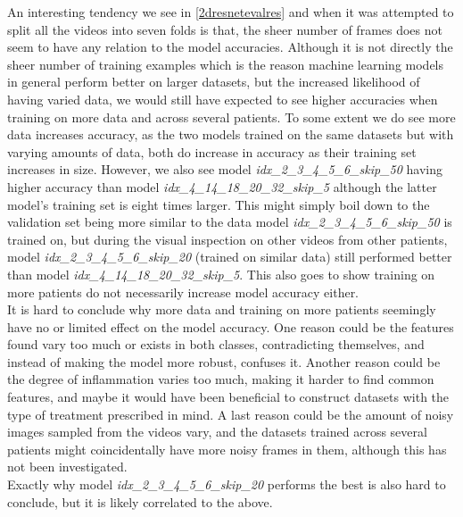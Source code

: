 An interesting tendency we see in \autoref{2dresnetevalres} and when it was attempted to split all the videos into seven folds is that, the sheer number of frames does not seem to have any relation to the model accuracies. Although it is not directly the sheer number of training examples which is the reason machine learning models in general perform better on larger datasets, but the increased likelihood of having varied data, we would still have expected to see higher accuracies when training on more data and across several patients. To some extent we do see more data increases accuracy, as the two models trained on the same datasets but with varying amounts of data, both do increase in accuracy as their training set increases in size. However, we also see model \textit{idx\_2\_3\_4\_5\_6\_skip\_50} having higher accuracy than model \textit{idx\_4\_14\_18\_20\_32\_skip\_5} although the latter model's training set is eight times larger. This might simply boil down to the validation set being more similar to the data model \textit{idx\_2\_3\_4\_5\_6\_skip\_50} is trained on, but during the visual inspection on other videos from other patients, model \textit{idx\_2\_3\_4\_5\_6\_skip\_20} (trained on similar data) still performed better than model \textit{idx\_4\_14\_18\_20\_32\_skip\_5}. This also goes to show training on more patients do not necessarily increase model accuracy either.\\
It is hard to conclude why more data and training on more patients seemingly have no or limited effect on the model accuracy. One reason could be the features found vary too much or exists in both classes, contradicting themselves, and instead of making the model more robust, confuses it. Another reason could be the degree of inflammation varies too much, making it harder to find common features, and maybe it would have been beneficial to construct datasets with the type of treatment prescribed in mind. A last reason could be the amount of noisy images sampled from the videos vary, and the datasets trained across several patients might coincidentally have more noisy frames in them, although this has not been investigated.\\
Exactly why model \textit{idx\_2\_3\_4\_5\_6\_skip\_20} performs the best is also hard to conclude, but it is likely correlated to the above.


